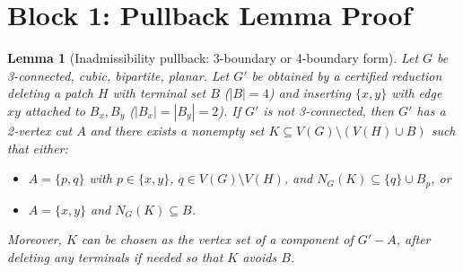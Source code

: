 \documentclass[12pt]{article}
\newtheorem{lemma}[theorem]{Lemma}
\begin{document}
\section*{Block 1: Pullback Lemma Proof}

\begin{lemma}[Inadmissibility pullback: 3-boundary or 4-boundary form]
Let $G$ be 3-connected, cubic, bipartite, planar. Let $G'$ be obtained by a certified reduction deleting a patch $H$ with terminal set $B$ ($|B|=4$) and inserting $\{x,y\}$ with edge $xy$ attached to $B_x, B_y$ ($|B_x|=|B_y|=2$).
If $G'$ is not 3-connected, then $G'$ has a 2-vertex cut $A$ and there exists a nonempty set $K \subseteq V(G) \setminus (V(H) \cup B)$ such that either:
\begin{itemize}
    \item[\textup{(3-boundary)}] $A=\{p,q\}$ with $p\in\{x,y\}$, $q\in V(G)\setminus V(H)$, and $N_G(K) \subseteq \{q\} \cup B_p$, or
    \item[\textup{(4-boundary)}] $A=\{x,y\}$ and $N_G(K) \subseteq B$.
\end{itemize}
Moreover, $K$ can be chosen as the vertex set of a component of $G'-A$, after deleting any terminals if needed so that $K$ avoids $B$.
\end{lemma}
\end{document}
